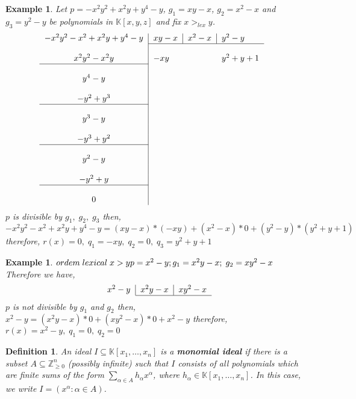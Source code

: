 \documentclass[a4paper,12pt]{article}
\newtheorem{definition}[theorem]{Definition}
\newtheorem{example}[theorem]{Example}
\newcommand{\KK}{\mathbb{K}}
\newcommand{\ZZ}{\mathbb{Z}}
\begin{document}
	\begin{example}
	Let
	$p = -x^2y^2+x^2y+y^4-y$,
	$g_1 = xy-x$,
	$g_2 = x^2-x$ and $g_3 = y^2-y $ be polynomials in $\KK[x,y,z]$ and fix $x >_{lex} y$. 
	\[
	\begin{tabular}{c|llll}
	\multicolumn{1}{l|}{$ -x^2y^2-x^2+x^2y+y^4-y $} & \multicolumn{1}{l|}{$ xy-x $} & \multicolumn{1}{l|}{$ x^2-x $} & $ y^2-y $ & \\ \cline{2-4} \\
	$ x^2y^2-x^2y $ & $ -xy $ & & $ y^2+y+1 $ & \\ \cline{1-1} \\
	$ y^4-y $ & & & &  \\ \\
	$ -y^2+y^3 $ & & & &  \\ \cline{1-1} \\
	$ y^3-y $ & & & &  \\ \\
	$  -y^3+y^2 $ & & & &  \\ \cline{1-1} \\
	$ y^2-y $ & & & &  \\ \\
	$ -y^2+y $ & & & &  \\ \cline{1-1} \\
	0 & & & & 
	\end{tabular}
	\]
	$ p $ is divisible by $ g_1, \; g_2, \; g_3 $ then, \\
	$ -x^2y^2-x^2+x^2y+y^4-y = (xy-x)*(-xy) + (x^2-x)*0 + (y^2-y)*(y^2+y+1)  $ therefore, $ r(x)=0, \; q_1 = -xy, \; q_2 = 0, \; q_3 = y^2+y+1 $
\end{example}
\begin{example}
	$ ordem \; lexical \; x > y \\ 
	p = x^2-y; \\
	g_1 = x^2y-x; \; g_2 = xy^2-x $ \\
	Therefore we have, 
	\[
	\begin{tabular}{l|l|l}
	$ x^2-y $ & $ x^2y-x $ & $ xy^2-x $ \\ \cline{2-3} 
	\end{tabular}
	\]
	$ p $ is not divisible by $ g_1 $ and $ g_2 $ then, \\
	$ x^2-y=(x^2y-x)*0 + (xy^2-x)*0 +x^2-y$ therefore, $ r(x)=x^2-y ,\; q_1=0,\; q_2=0 $
\end{example}

\begin{definition}
	An ideal $I \subseteq \KK[x_1, \ldots, x_n]$ is a \textbf{monomial ideal} if there is a subset $A \subseteq \ZZ_{\geq 0}^n$ (possibly infinite) such that $I$ consists of all polynomials which are finite sums of the form $\sum_{\alpha \in A} h_\alpha x^\alpha$, where $h_\alpha \in \KK[x_1, \ldots, x_n]$. In this case, we write $I = (x^\alpha : \alpha \in A)$.
\end{definition}
\end{document}
